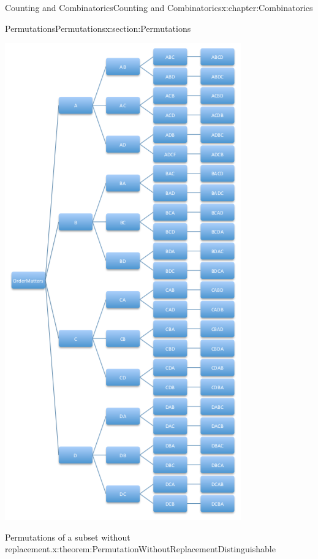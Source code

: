 \documentclass[oneside,10pt,]{book}
\numberwithin{equation}{section}
\begin{document}
\begin{chapterptx}{Counting and Combinatorics}{}{Counting and Combinatorics}{}{}{x:chapter:Combinatorics}
\begin{sectionptx}{Permutations}{}{Permutations}{}{}{x:section:Permutations}
\begin{image}{0}{1}{0}
\includegraphics[width=\linewidth]{images/PermutationAllTree.png}
\end{image}%
%
\begin{theorem}{Permutations of a subset without replacement.}{}{x:theorem:PermutationWithoutReplacementDistinguishable}%

\end{theorem}
\end{sectionptx}
\end{chapterptx}
\end{document}
